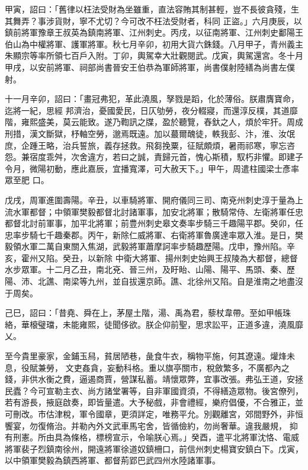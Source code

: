 \begin{pinyinscope}
 甲寅，詔曰：「舊律以枉法受財為坐雖重，直法容賄其制甚輕，豈不長彼貪殘，生其舞弄？事涉貨財，寧不尤切？今可改不枉法受財者，科同
 正盜。」六月庚辰，以鎮前將軍豫章王叔英為鎮南將軍、江州刺史。丙戌，以征南將軍、江州刺史鄱陽王伯山為中權將軍、護軍將軍。秋七月辛卯，初用大貨六銖錢。八月甲子，青州義主朱顯宗等率所領七百戶入附。丁卯，輿駕幸大壯觀閱武。戊寅，輿駕還宮。冬十月甲戌，以安前將軍、祠部尚書晉安王伯恭為軍師將軍，尚書僕射陸繕為尚書左僕射。



 十一月辛卯，詔曰：「畫冠弗犯，革此澆風，孥戮是蹈，化於薄俗。朕肅膺寶命，迄將一紀，思經
 邦濟治，憂國愛民，日仄劬勞，夜分輟寢，而還淳反樸，其道靡階，雍熙盛美，莫云能致。遂乃鞫訊之牒，盈於聽覽，舂釱之人，煩於牢犴。周成刑措，漢文斷獄，杼軸空勞，邈焉既遠。加以蕞爾醜徒，軼我彭、汴，淮、汝氓庶，企踵王略，治兵誓旅，義存拯救。飛芻挽粟，征賦頗煩，暑雨祁寒，寧忘咨怨。兼宿度乖舛，次舍違方，若曰之誠，責歸元首，愧心斯積，馭朽非懼。即建子令月，微陽初動，應此嘉辰，宜播寬澤，可大赦天下。」甲午，周遣柱國梁士彥率眾至肥
 口。



 戊戌，周軍進圍壽陽。辛丑，以車騎將軍、開府儀同三司、南兗州刺史淳于量為上流水軍都督；中領軍樊毅都督北討諸軍事，加安北將軍；散騎常侍、左衛將軍任忠都督北討前軍事，加平北將軍；前豊州刺史皋文奏率步騎三千趣陽平郡。癸卯，任忠率步騎七千趣秦郡。丙午，新除仁威將軍、右衛將軍魯廣達率眾入淮。是日，樊毅領水軍二萬自東關入焦湖，武毅將軍蕭摩訶率步騎趣歷陽。戊申，豫州陷。辛亥，霍州又陷。癸丑，以新除
 中衛大將軍、揚州刺史始興王叔陵為大都督，總督水步眾軍。十二月乙丑，南北兗、晉三州，及盱眙、山陽、陽平、馬頭、秦、歷陽、沛、北譙、南梁等九州，並自拔還京師。譙、北徐州又陷。自是淮南之地盡沒于周矣。



 己巳，詔曰：「昔堯、舜在上，茅屋土階，湯、禹為君，藜杖韋帶。至如甲帳珠絡，華榱璧璫，未能雍熙，徒聞侈欲。朕企仰前聖，思求訟平，正道多違，澆風靡乂。



 至今貴里豪家，金鋪玉舄，貧居陋巷，彘食牛衣，稱物平施，何其遼遠。爟烽未息，役賦兼勞，
 文吏姦貪，妄動科格。重以旗亭關市，稅斂繁多，不廣都內之錢，非供水衡之費，逼遏商賈，營謀私蓄。靖懷眾弊，宜事改張。弗弘王道，安拯民蠹？今可宣勒主衣、尚方諸堂署等，自非軍國資須，不得繕造眾物。後宮僚列，若有游長，掖庭啟奏，即皆量遣。大予秘戲，非會禮經，樂府倡優，不合雅正，並可刪改。市估津稅，軍令國章，更須詳定，唯務平允。別觀離宮，郊間野外，非恒饗宴，勿復脩治。并勒內外文武車馬宅舍，皆循儉約，勿尚奢華。違我嚴規，
 抑有刑憲。所由具為條格，標榜宣示，令喻朕心焉。」癸酉，遣平北將軍沈恪、電威將軍裴子烈鎮南徐州，開遠將軍徐道奴鎮柵口，前信州刺史楊寶安鎮白下。戊寅，以中領軍樊毅為鎮西將軍、都督荊郢巴武四州水陸諸軍事。




\end{pinyinscope}
